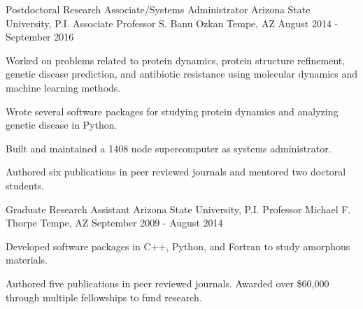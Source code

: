 \begin{cventries}
  \cventry
    {Postdoctoral Research Associate/Systems Administrator} %
    {Arizona State University, P.I. Associate Professor S. Banu Ozkan} %
    {Tempe, AZ} %
    {August 2014 - September 2016} %
    {
      \begin{cvitems} %
        \item {Worked on problems related to protein dynamics, protein structure refinement, genetic disease prediction, and antibiotic resistance using molecular dynamics and machine learning methods.}
        \item {Wrote several software packages for studying protein dynamics and analyzing genetic disease in Python.}
        \item {Built and maintained a 1408 node supercomputer as systems administrator.}
        \item {Authored six publications in peer reviewed journals and mentored two doctoral students.}
      \end{cvitems}
    }

  \cventry
  {Graduate Research Assistant} %
  {Arizona State University, P.I. Professor Michael F. Thorpe} %
  {Tempe, AZ} %
  {September 2009 - August 2014} %
    {
      \begin{cvitems} %
        \item {Developed software packages in C++, Python, and Fortran to study amorphous materials.}
        \item {Authored five publications in peer reviewed journals. Awarded over \$60,000 through multiple fellowships to fund research.}
      \end{cvitems}
    }


\end{cventries}
